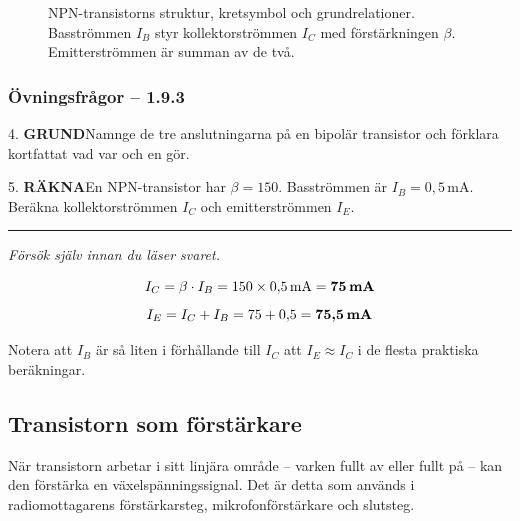 \documentclass[a4paper,11pt,twoside]{book}
\newcommand{\qgrund}{\colorbox{greenpale}{\textcolor{greendark}{\headingfont\bfseries\tiny GRUND}}}
\newcommand{\qrakna}{\colorbox{bluepale}{\textcolor{bluedark}{\headingfont\bfseries\tiny RÄKNA}}}
\begin{document}
\begin{figure}[htbp]
\begin{tikzpicture}[font=\small, >=stealth]
\end{tikzpicture}
\caption{NPN-transistorns struktur, kretsymbol och grundrelationer.
Basströmmen $I_B$ styr kollektorströmmen $I_C$ med förstärkningen
$\beta$. Emitterströmmen är summan av de två.}
\label{fig:npn_transistor}
\end{figure}

\subsubsection*{Övningsfrågor -- 1.9.3}

\begin{qblock}{4.}
\qgrund\quad Namnge de tre anslutningarna på en bipolär transistor
och förklara kortfattat vad var och en gör.
\end{qblock}

\begin{qblock}{5.}
\qrakna\quad En NPN-transistor har $\beta = 150$.
Basströmmen är $I_B = 0{,}5\,\text{mA}$.
Beräkna kollektorströmmen $I_C$ och emitterströmmen $I_E$.
\end{qblock}

\medskip
\noindent\rule{\textwidth}{0.4pt}
{\small\itshape Försök själv innan du läser svaret.}
\medskip

\begin{worked}[title={Lösning -- Räkneexempel 1.9.3}]
\[ I_C = \beta \cdot I_B = 150 \times 0{,}5\,\text{mA}
   = \textbf{75\,mA} \]
\[ I_E = I_C + I_B = 75 + 0{,}5 = \textbf{75{,}5\,mA} \]

Notera att $I_B$ är så liten i förhållande till $I_C$ att
$I_E \approx I_C$ i de flesta praktiska beräkningar.
\end{worked}

\subsection{Transistorn som förstärkare}

När transistorn arbetar i sitt linjära område -- varken fullt
av eller fullt på -- kan den förstärka en växelspänningssignal.
Det är detta som används i radiomottagarens förstärkarsteg,
mikrofonförstärkare och slutsteg.
\end{document}

